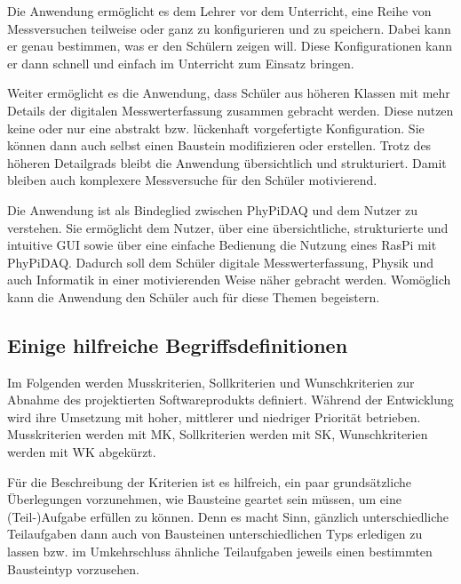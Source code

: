 \documentclass[parskip=full]{scrartcl}
\begin{document}
Die Anwendung ermöglicht es dem Lehrer vor dem Unterricht, eine Reihe von Messversuchen teilweise oder ganz zu konfigurieren und zu speichern. Dabei kann er genau bestimmen, was er den Schülern zeigen will. Diese Konfigurationen kann er dann schnell und einfach im Unterricht zum Einsatz bringen. 

Weiter ermöglicht es die Anwendung, dass Schüler aus höheren Klassen mit mehr Details der digitalen Messwerterfassung zusammen gebracht werden. Diese nutzen keine oder nur eine abstrakt bzw. lückenhaft vorgefertigte Konfiguration. Sie können dann auch selbst einen Baustein modifizieren oder erstellen. Trotz des höheren Detailgrads bleibt die Anwendung übersichtlich und strukturiert. Damit bleiben auch komplexere Messversuche für den Schüler motivierend. 

Die Anwendung ist als Bindeglied zwischen \gls{PhyPiDAQ} und dem Nutzer zu verstehen. Sie ermöglicht dem Nutzer, über eine übersichtliche, strukturierte und intuitive GUI sowie über eine einfache Bedienung die Nutzung eines \gls{RasPi} mit \gls{PhyPiDAQ}. Dadurch soll dem Schüler digitale Messwerterfassung, Physik und auch Informatik in einer motivierenden Weise näher gebracht werden. Womöglich kann die Anwendung den Schüler auch für diese Themen begeistern.  

\subsection{Einige hilfreiche Begriffsdefinitionen}

Im Folgenden werden \gls{Musskriterien}, \gls{Sollkriterien} und \gls{Wunschkriterien} zur Abnahme des projektierten Softwareprodukts definiert. Während der Entwicklung wird ihre Umsetzung mit hoher, mittlerer und niedriger Priorität betrieben. Musskriterien werden mit MK, Sollkriterien werden mit SK, Wunschkriterien werden mit WK abgekürzt.

\newtheorem{MussKrit}{MK}
\newtheorem{SollKrit}{SK}
\newtheorem{WunschKrit}{WK}

Für die Beschreibung der Kriterien ist es hilfreich, ein paar grundsätzliche Überlegungen vorzunehmen, wie Bausteine geartet sein müssen, um eine (Teil-)Aufgabe erfüllen zu können. Denn es macht Sinn, gänzlich unterschiedliche Teilaufgaben dann auch von Bausteinen unterschiedlichen Typs erledigen zu lassen bzw. im Umkehrschluss ähnliche Teilaufgaben jeweils einen bestimmten Bausteintyp vorzusehen.
\end{document}
